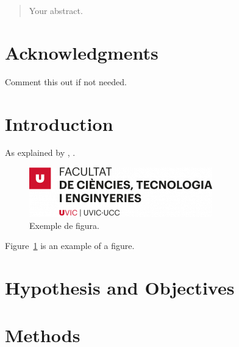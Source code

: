 \documentclass[12pt,twoside]{article}
\date{June 2024}
\begin{document}



\clearpage{\pagestyle{empty}\cleardoublepage}
\setcounter{page}{1}
\pagestyle{fancy}

\begin{abstract}
Your abstract.\cite{wood1984spelunking}


\end{abstract}

\clearpage
\section*{Acknowledgments}
Comment this out if not needed.

\clearpage{\pagestyle{empty}}

\tableofcontents 
\clearpage{\pagestyle{empty}}
\setcounter{page}{1}
\fancyhead[LE,RO]{\slshape \rightmark}
\fancyhead[LO,RE]{\slshape \leftmark}


\section{Introduction}

As explained by \cite{wood1984spelunking}, .

\begin{figure}[tb]
\centering
\includegraphics[width = 0.4\hsize]{./figures/FCTE}
\caption{Exemple de figura.}
\label{fig:logo}
\end{figure}

Figure~\ref{fig:logo} is an example of a figure. 

\clearpage
\section{Hypothesis and Objectives}

\lipsum[1-10]
\newpage
\section{Methods}
\lipsum[1-10]
\clearpage
\end{document}
